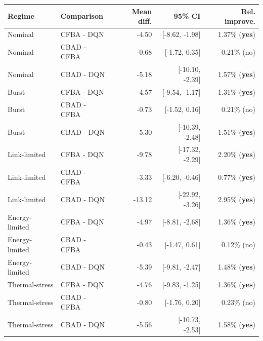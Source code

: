 \begin{tabular}{llrrr}
\toprule
Regime & Comparison & Mean diff. & 95\% CI & Rel. improve. \\
\midrule
Nominal & CFBA - DQN & -4.50 & [-8.62, -1.98] & 1.37\% (\textbf{yes}) \\
Nominal & CBAD - CFBA & -0.68 & [-1.72, 0.35] & 0.21\% (no) \\
Nominal & CBAD - DQN & -5.18 & [-10.10, -2.39] & 1.57\% (\textbf{yes}) \\
Burst & CFBA - DQN & -4.57 & [-9.54, -1.17] & 1.31\% (\textbf{yes}) \\
Burst & CBAD - CFBA & -0.73 & [-1.52, 0.16] & 0.21\% (no) \\
Burst & CBAD - DQN & -5.30 & [-10.39, -2.48] & 1.51\% (\textbf{yes}) \\
Link-limited & CFBA - DQN & -9.78 & [-17.32, -2.29] & 2.20\% (\textbf{yes}) \\
Link-limited & CBAD - CFBA & -3.33 & [-6.20, -0.46] & 0.77\% (\textbf{yes}) \\
Link-limited & CBAD - DQN & -13.12 & [-22.92, -3.26] & 2.95\% (\textbf{yes}) \\
Energy-limited & CFBA - DQN & -4.97 & [-8.81, -2.68] & 1.36\% (\textbf{yes}) \\
Energy-limited & CBAD - CFBA & -0.43 & [-1.47, 0.61] & 0.12\% (no) \\
Energy-limited & CBAD - DQN & -5.39 & [-9.81, -2.47] & 1.48\% (\textbf{yes}) \\
Thermal-stress & CFBA - DQN & -4.76 & [-9.83, -1.25] & 1.36\% (\textbf{yes}) \\
Thermal-stress & CBAD - CFBA & -0.80 & [-1.76, 0.20] & 0.23\% (no) \\
Thermal-stress & CBAD - DQN & -5.56 & [-10.73, -2.53] & 1.58\% (\textbf{yes}) \\
\bottomrule
\end{tabular}